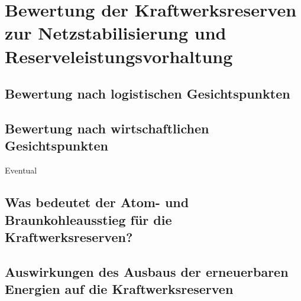 \section{Bewertung der Kraftwerksreserven zur Netzstabilisierung und Reserveleistungsvorhaltung}

	\subsection{Bewertung nach logistischen Gesichtspunkten}
	
	
	
	\subsection{Bewertung nach wirtschaftlichen Gesichtspunkten}
	Eventual
	
	
	\subsection{Was bedeutet der Atom- und Braunkohleausstieg für die Kraftwerksreserven?}
	
	
		
	\subsection{Auswirkungen des Ausbaus der erneuerbaren Energien auf die Kraftwerksreserven}